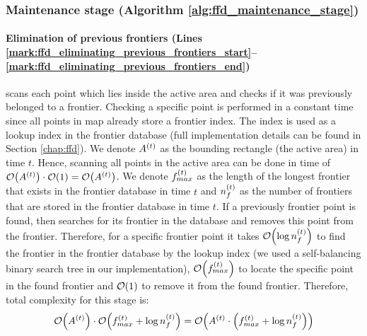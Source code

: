 \subsubsection{Maintenance stage (Algorithm \ref{alg:ffd_maintenance_stage})}
\paragraph{Elimination of previous frontiers (Lines
\ref{mark:ffd_eliminating_previous_frontiers_start}--\ref{mark:ffd_eliminating_previous_frontiers_end})}
\FFD scans each point which lies inside the active area and checks if it was
previously belonged to a frontier. Checking a specific point is performed in a
constant time since all points in map already store a frontier index. The index
is used as a lookup index in the frontier database (full implementation details
can be found in Section \ref{chap:ffd}). We denote $A^{\left(t\right)}$ as the
bounding rectangle (the active area) in time $t$. Hence, scanning all points in the
active area can be done in time of $\mathcal{O}{\left(A^{\left(t\right)}\right)} \cdot \mathcal{O}{\left(1\right)} =
\mathcal{O}{\left(A^{\left(t\right)}\right)}$. We denote $f_{max}^{\left(t\right)}$ as the length of the
longest frontier that exists in the frontier database in time $t$ and
$n_f^{\left(t\right)}$ as the number of frontiers that are stored in the frontier
database in time $t$. If a previously frontier point is found, then \FFD
searches for its frontier in the database and removes this point from the
frontier. Therefore, for a specific frontier point it takes
$\mathcal{O}{\left(\log{n_f^{\left(t\right)}}\right)}$ to find the frontier in the frontier database by
the lookup index (we used a self-balancing binary search tree in our
implementation), $\mathcal{O}{\left(f_{max}^{\left(t\right)}\right)}$ to locate the specific point in
the found frontier and $\mathcal{O}{\left(1\right)}$ to remove it from the found frontier.
Therefore, total complexity for this stage is:
\begin{equation}\label{eq:elimination}
	\mathcal{O}{\left(A^{\left(t\right)}\right)} \cdot
    \mathcal{O}{\left(f_{max}^{\left(t\right)} +
        \log{n_f^{\left(t\right)}}\right)}
    =
    \mathcal{O}{\left(A^{\left(t\right)} \cdot
        \left(f_{max}^{\left(t\right)} +
        \log{n_f^{\left(t\right)}}\right)\right)} 
\end{equation}

